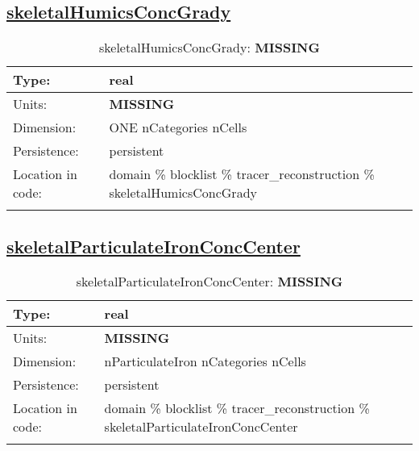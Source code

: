 \subsection[skeletalHumicsConcGrady]{\hyperref[sec:var_tab_tracer_reconstruction]{skeletalHumicsConcGrady}}
\label{subsec:var_sec_tracer_reconstruction_skeletalHumicsConcGrady}
\begin{center}
\begin{longtable}{| p{2.0in} | p{4.0in} |}
        \hline 
        Type: & real \\
        \hline 
        Units: & {\bf \color{red} MISSING} \\
        \hline 
        Dimension: & ONE nCategories nCells \\
        \hline 
        Persistence: & persistent \\
        \hline 
         Location in code: & domain \% blocklist \% tracer\_reconstruction \% skeletalHumicsConcGrady \\
         \hline 
    \caption{skeletalHumicsConcGrady: {\bf \color{red} MISSING}}
\end{longtable}
\end{center}
\subsection[skeletalParticulateIronConcCenter]{\hyperref[sec:var_tab_tracer_reconstruction]{skeletalParticulateIronConcCenter}}
\label{subsec:var_sec_tracer_reconstruction_skeletalParticulateIronConcCenter}
\begin{center}
\begin{longtable}{| p{2.0in} | p{4.0in} |}
        \hline 
        Type: & real \\
        \hline 
        Units: & {\bf \color{red} MISSING} \\
        \hline 
        Dimension: & nParticulateIron nCategories nCells \\
        \hline 
        Persistence: & persistent \\
        \hline 
         Location in code: & domain \% blocklist \% tracer\_reconstruction \% skeletalParticulateIronConcCenter \\
         \hline 
    \caption{skeletalParticulateIronConcCenter: {\bf \color{red} MISSING}}
\end{longtable}
\end{center}
